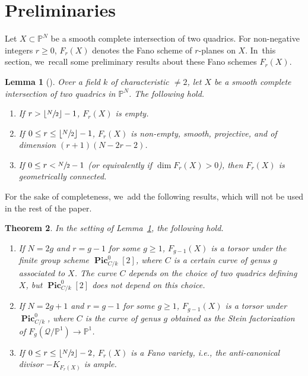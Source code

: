 \documentclass[JEP,XML,SOM,Unicode,NoEqCountersInSection,published]{cedram}
\let\bb\mathbb\let\Bbb\mathbb
\theoremstyle{plain}
\newtheorem{thm}{Theorem}[section]
\newtheorem{lem}[thm]{Lemma}
\theoremstyle{definition}
\DeclareMathOperator{\bPic}{\mathbf{Pic}}
\renewcommand\P{\mathbb{P}}
\begin{document}
\section{Preliminaries}\label{sec:background}


Let \(X\subset\bb P^N\) be a smooth complete intersection of two quadrics. For non-negative integers $r\geq 0$, $F_r(X)$ denotes the Fano scheme of $r$-planes on $X$. In~this section, we~recall some preliminary results about these Fano schemes \(F_r(X)\).

\begin{lem}[{\cite[Lem.\,A.3 \& A.4]{CT-intersection-quadrics}}]\label{lem:Kuznetsov_fanoscheme}
Over a field \(k\) of characteristic \(\neq 2\), let $X$ be a smooth complete intersection of two quadrics in $\P^{N}$. The following hold.
\begin{enumerate}
\item
If $r>\lfloor\sfrac{N}{2}\rfloor -1$,
$F_r(X)$ is empty.
\item
If $0\leq r\leq \lfloor\sfrac{N}{2}\rfloor -1$,
$F_r(X)$ is non-empty, smooth, projective, and of dimension $(r+1)(N-2r-2)$.
\item If $0\leq r< \sfrac{N}{2} -1$ (or equivalently if $\dim F_r(X)>0$), then $F_r(X)$ is geometrically connected.
\end{enumerate}
\end{lem}

For the sake of completeness, we~add the following results, which will not be used in the rest of the paper.

\begin{thm}
In the setting of Lemma~\ref{lem:Kuznetsov_fanoscheme}, the following hold.
\begin{enumerate}
\item\label{item:fanoschemes-structures-finite} If $N=2g$ and $r=g-1$ for some $g\geq 1$, $F_{g-1}(X)$ is a torsor under the finite group scheme $\bPic^0_{C/k}[2]$, where $C$ is a certain curve of genus $g$ associated to $X$. The curve $C$ depends on the choice of two quadrics defining $X$, but $\bPic^0_{C/k}[2]$ does not depend on this choice.
\item\label{item:fanoschemes-structures-torsor} If $N=2g+1$ and $r=g-1$ for some $g\geq 1$,
$F_{g-1}(X)$ is a torsor under $\bPic_{C/k}^0$, where $C$ is the curve of genus $g$ obtained as the Stein factorization of $F_g(\mathcal{Q}/\P^1)\to\P^1$.
\item\label{item:fanoschemes-structures-fano} If $0\leq r\leq \lfloor\sfrac{N}{2}\rfloor -2$, $F_r(X)$ is a Fano variety, i.e., the anti-canonical divisor $-K_{F_r(X)}$ is ample.
\end{enumerate}
\end{thm}
\end{document}
